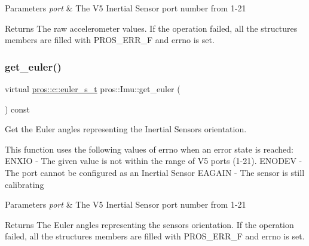 \begin{DoxyParams}{Parameters}
{\em port} & The V5 Inertial Sensor port number from 1-\/21 \\
\hline
\end{DoxyParams}
\begin{DoxyReturn}{Returns}
The raw accelerometer values. If the operation failed, all the structure\textquotesingle{}s members are filled with P\+R\+O\+S\+\_\+\+E\+R\+R\+\_\+F and errno is set. 
\end{DoxyReturn}
\mbox{\label{classpros_1_1Imu_acd2f926bc97121518da774eefe6fc9e2}} 
\subsubsection{\texorpdfstring{get\+\_\+euler()}{get\_euler()}}
{\footnotesize\ttfamily virtual \hyperlink{imu_8h_a93e80020ec907b7e11ac7166e5d01c55}{pros\+::c\+::euler\+\_\+s\+\_\+t} pros\+::\+Imu\+::get\+\_\+euler (\begin{DoxyParamCaption}{ }\end{DoxyParamCaption}) const\hspace{0.3cm}{\ttfamily [virtual]}}



Get the Euler angles representing the Inertial Sensor\textquotesingle{}s orientation. 

This function uses the following values of errno when an error state is reached\+: E\+N\+X\+IO -\/ The given value is not within the range of V5 ports (1-\/21). E\+N\+O\+D\+EV -\/ The port cannot be configured as an Inertial Sensor E\+A\+G\+A\+IN -\/ The sensor is still calibrating


\begin{DoxyParams}{Parameters}
{\em port} & The V5 Inertial Sensor port number from 1-\/21 \\
\hline
\end{DoxyParams}
\begin{DoxyReturn}{Returns}
The Euler angles representing the sensor\textquotesingle{}s orientation. If the operation failed, all the structure\textquotesingle{}s members are filled with P\+R\+O\+S\+\_\+\+E\+R\+R\+\_\+F and errno is set. 
\end{DoxyReturn}
\mbox{\label{classpros_1_1Imu_a632aecd3cf0866827ba6521dc19f357d}} 
